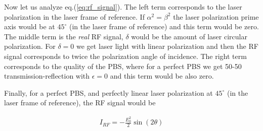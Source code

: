 \documentclass{article}
\begin{document}
 Now let us analyze eq.(\ref{eq:rf_signal}). The left term corresponds to the laser polarization in the laser frame of reference. If $\alpha^2=\beta^2$ the laser polarization prime axis would be at $45^{\circ}$ (in the laser frame of reference) and this term would be zero. The middle term is the \emph{real} RF signal, $\delta$ would be the amount of laser circular polarization. For $\delta=0$ we get laser light with linear polarization and then the RF signal corresponds to twice the polarization angle of incidence. The right term corresponds to the quality of the PBS, where for a perfect PBS we get 50-50 transmission-reflection with $\epsilon=0$ and this term would be also zero.
 
 Finally, for a perfect PBS, and perfectly linear laser polarization at $45^{\circ}$ (in the laser frame of reference), the RF signal would be
 
 \begin{align}
     \boxed{I_{RF} = -\frac{E_0^2}{2} \sin{\left(2\theta\right)}}\label{eq:perfect_RF_signal}
 \end{align}
 
 
 
 


\end{document}
